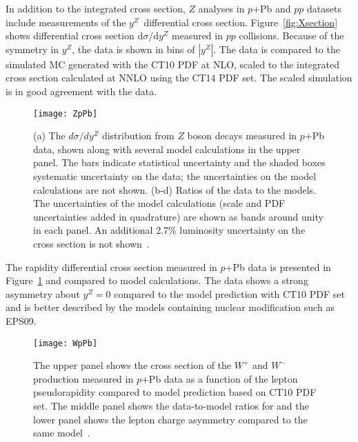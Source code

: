 \documentclass[3p,times,twocolumn]{elsarticle}
\newcommand*{\pPb}{\ensuremath{p}+Pb\xspace}
\newcommand*{\Zboson}{\ensuremath{Z}\xspace}
\newcommand*{\pp}{\ensuremath{pp}\xspace}
\newcommand{\yZ}{\mbox{$y^{Z}$}\xspace}
\begin{document}

In addition to the integrated cross section, \Zboson analyses in \pPb and \pp datasets include measurements of the \yZ\ differential cross section. Figure~\ref{fig:Xsection} shows differential cross section $\textrm{d}\sigma/\textrm{d}y^{Z}$ measured in \pp collisions.  Because of the symmetry in \yZ, the data is shown in bins of $|\yZ|$.  The data is compared to the simulated MC generated with the CT10 PDF at NLO, scaled to the integrated cross section calculated at NNLO using the CT14 PDF set.  The scaled simulation is in good agreement with the data. \par


\begin{figure}[ht!]
\centering
\texttt{[image: ZpPb]}
\caption{ (a) The $d\sigma/dy^{Z}$ distribution from \Zboson boson decays measured in \pPb data, shown along with several model calculations in the upper panel. The bars indicate statistical uncertainty and the shaded boxes systematic uncertainty on the data; the uncertainties on the model calculations are not shown. (b-d) Ratios of the data to the models. The uncertainties of the model calculations (scale and PDF uncertainties added in quadrature) are shown as bands around unity in each panel. An additional 2.7\% luminosity uncertainty on the cross section is not shown~\cite{Aad:2015gta}.}
\label{fig:pPbZ}
\end{figure}


The rapidity differential cross section measured in \pPb data is presented in Figure~\ref{fig:pPbZ} and compared to model calculations. The data shows a strong asymmetry about $y^{Z}=0$ compared to the model prediction with CT10 PDF set and is better described by the models containing nuclear modification such as EPS09.  

\begin{figure}[ht!]
\centering
\texttt{[image: WpPb]}
\caption{The upper panel shows the cross section of the $W^{+}$ and $W^{-}$ production measured in \pPb data as a function of the lepton pseudorapidity compared to model prediction based on CT10 PDF set. The middle panel shows the data-to-model ratios for and the lower panel shows the lepton charge asymmetry compared to the same model~\cite{Markus:2015}.}
\label{fig:WpPb}
\end{figure}
\end{document}
